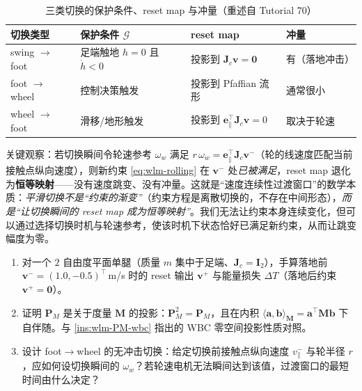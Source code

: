 \begin{table}[H]\centering\small
\caption{三类切换的保护条件、reset map 与冲量（重述自 Tutorial 70）}
\label{tab:wlm-switch-types}
\begin{tabular}{llll}
\toprule
切换类型 & 保护条件 $\mathcal G$ & reset map & 冲量 \\
\midrule
swing $\to$ foot & 足端触地 $h=0$ 且 $\dot h<0$ & 投影到 $\mathbf J_c\mathbf v=\mathbf0$ & 有（落地冲击） \\
foot $\to$ wheel & 控制决策触发 & 投影到 Pfaffian 流形 & 通常很小 \\
wheel $\to$ foot & 滑移/地形触发 & 投影到 $\mathbf e_\parallel^\top\mathbf J_c\mathbf v=0$ & 取决于轮速 \\
\bottomrule
\end{tabular}
\end{table}

\begin{insight}[foot$\leftrightarrow$wheel 平滑切换 $=$ 让 reset map 成为恒等映射]\label{ins:wlm-identity-reset}
关键观察：若切换瞬间令轮速参考 $\omega_w$ 满足 $r\,\omega_w=\mathbf e_\parallel^\top\mathbf J_c\mathbf v^-$（轮的线速度匹配当前接触点纵向速度），则新约束 \cref{eq:wlm-rolling} 在 $\mathbf v^-$ 处\emph{已被满足}，reset map 退化为\textbf{恒等映射}——没有速度跳变、没有冲量。这就是“速度连续性过渡窗口”的数学本质：\emph{平滑切换不是“约束的渐变”}（约束方程是离散切换的，不存在中间形态），\emph{而是“让切换瞬间的 reset map 成为恒等映射”}。我们无法让约束本身连续变化，但可以通过选择切换时机与轮速参考，使该时机下状态恰好已满足新约束，从而让跳变幅度为零。
\end{insight}

\begin{practice}
\begin{enumerate}
  \item 对一个 $2$ 自由度平面单腿（质量 $m$ 集中于足端、$\mathbf J_c=\mathbf I_2$），手算落地前 $\mathbf v^-=(1.0,-0.5)^\top\,$m/s 时的 reset 输出 $\mathbf v^+$ 与能量损失 $\Delta T$（落地后约束 $\mathbf v^+=\mathbf0$）。
  \item 证明 $\mathbf P_M$ 是关于度量 $\mathbf M$ 的投影：$\mathbf P_M^2=\mathbf P_M$，且在内积 $\langle\mathbf a,\mathbf b\rangle_{\mathbf M}=\mathbf a^\top\mathbf M\mathbf b$ 下自伴随。与 \cref{ins:wlm-PM-wbc} 指出的 WBC 零空间投影性质对照。
  \item 设计 foot$\to$wheel 的无冲击切换：给定切换前接触点纵向速度 $v_\parallel^-$ 与轮半径 $r$，应如何设切换瞬间的 $\omega_w$？若轮速电机无法瞬间达到该值，过渡窗口的最短时间由什么决定？
\end{enumerate}
\end{practice}

